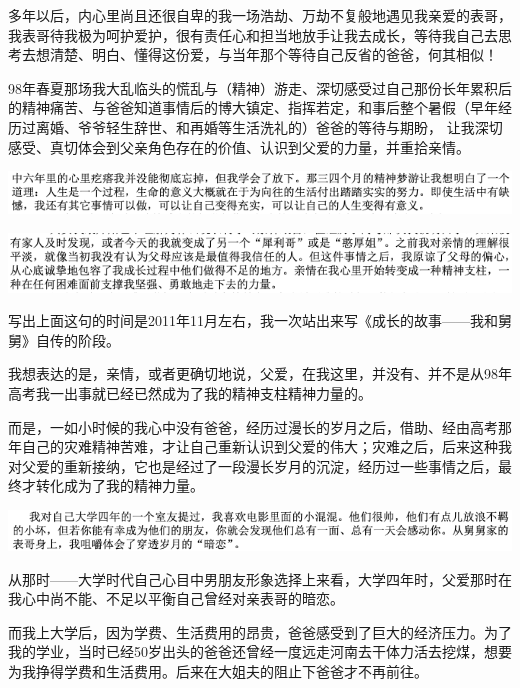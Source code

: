 \documentclass[9pt, b5paper]{article}
\begin{document}
多年以后，内心里尚且还很自卑的我一场浩劫、万劫不复般地遇见我亲爱的表哥，我表哥待我极为呵护爱护，很有责任心和担当地放手让我去成长，等待我自己去思考去想清楚、明白、懂得这份爱，与当年那个等待自己反省的爸爸，何其相似！

98年春夏那场我大乱临头的慌乱与（精神）游走、深切感受过自己那份长年累积后的精神痛苦、与爸爸知道事情后的博大镇定、指挥若定，和事后整个暑假（早年经历过离婚、爷爷轻生辞世、和再婚等生活洗礼的）爸爸的等待与期盼，
让我深切感受、真切体会到父亲角色存在的价值、认识到父爱的力量，并重拾亲情。

\begin{center}
\includegraphics[width=.9\linewidth]{./pic/backups_plans_20210422_174832.png}
\end{center}

\begin{center}
\includegraphics[width=.9\linewidth]{./pic/backups_plans_20210422_174916.png}
\end{center}

写出上面这句的时间是2011年11月左右，我一次站出来写《成长的故事——我和舅舅》自传的阶段。

我想表达的是，亲情，或者更确切地说，父爱，在我这里，并没有、并不是从98年高考我一出事就已经已然成为了我的精神支柱精神力量的。

而是，一如小时候的我心中没有爸爸，经历过漫长的岁月之后，借助、经由高考那年自己的灾难精神苦难，才让自己重新认识到父爱的伟大；灾难之后，后来这种我对父爱的重新接纳，它也是经过了一段漫长岁月的沉淀，经历过一些事情之后，最终才转化成为了我的精神力量。 

\begin{center}
\includegraphics[width=.9\linewidth]{./pic/backups_plans_20210422_223545.png}
\end{center}

从那时——大学时代自己心目中男朋友形象选择上来看，大学四年时，父爱那时在我心中尚不能、不足以平衡自己曾经对亲表哥的暗恋。

而我上大学后，因为学费、生活费用的昂贵，爸爸感受到了巨大的经济压力。为了我的学业，当时已经50岁出头的爸爸还曾经一度远走河南去干体力活去挖煤，想要为我挣得学费和生活费用。后来在大姐夫的阻止下爸爸才不再前往。
\end{document}
